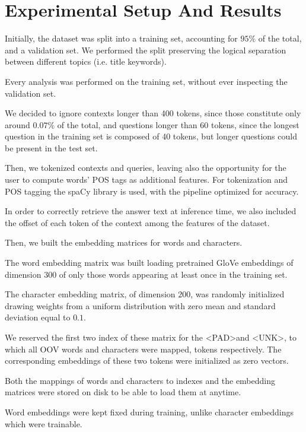 \chapter{Experimental Setup And Results}
    Initially, the dataset was split into a training set, accounting for $95\%$ of the total, and a validation set.
    We performed the split preserving the logical separation between different topics (i.e. title keywords).

    Every analysis was performed on the training set, without ever inspecting the validation set.

    We decided to ignore contexts longer than 400 tokens, since those constitute only around $0.07\%$ of the total, and questions longer than 60 tokens, since 
    the longest question in the training set is composed of 40 tokens, but longer questions could be present in the test set.
    
    Then, we tokenized contexts and queries, leaving also the opportunity for the user to compute words' POS tags as additional features.
    For tokenization and POS tagging the spaCy library is used, with the pipeline optimized for accuracy. 
    
    In order to correctly retrieve the answer text at inference time, we also included the offset of each token of the context among the features of the dataset.

    Then, we built the embedding matrices for words and characters.

    The word embedding matrix was built loading pretrained GloVe\cite{pennington-etal-2014-glove} embeddings of dimension $300$ of only those words appearing at least once in the training set.
    
    The character embedding matrix, of dimension $200$, was randomly initialized drawing weights from a uniform distribution with zero mean and standard deviation equal to $0.1$.

    We reserved the first two index of these matrix for the \textless PAD\textgreater  and \textless UNK\textgreater, to which all OOV words and characters were mapped, tokens respectively.
    The corresponding embeddings of these two tokens were initialized as zero vectors.

    Both the mappings of words and characters to indexes and the embedding matrices were stored on disk to be able to load them at anytime.

    Word embeddings were kept fixed during training, unlike character embeddings which were trainable.

